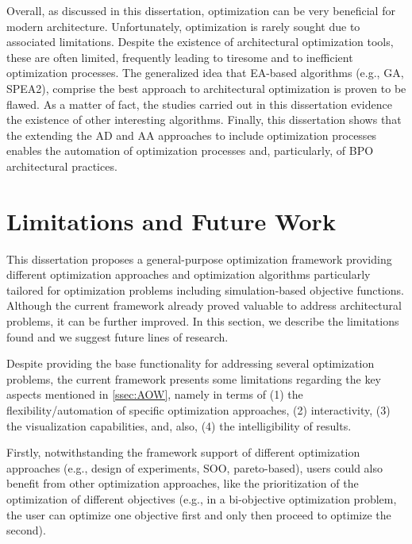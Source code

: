 Overall, as discussed in this dissertation, optimization can be very beneficial for modern architecture. Unfortunately, optimization is rarely sought due to associated limitations. Despite the existence of architectural optimization tools, these are often limited, frequently leading to tiresome and to inefficient optimization processes. The generalized idea that \ac{EA}-based algorithms (e.g., \ac{GA}, \ac{SPEA2}), comprise the best approach to architectural optimization is proven to be flawed. As a matter of fact, the studies carried out in this dissertation evidence the existence of other interesting algorithms. Finally, this dissertation shows that the extending the \ac{AD} and \ac{AA} approaches to include optimization processes enables the automation of optimization processes and, particularly, of \ac{BPO} architectural practices. 
	
\section{Limitations and Future Work}

This dissertation proposes a general-purpose optimization framework providing different optimization approaches and optimization algorithms particularly tailored for optimization problems including simulation-based objective functions. Although the current framework already proved valuable to address architectural problems, it can be further improved. In this section, we describe the limitations found and we suggest future lines of research.

Despite providing the base functionality for addressing several optimization problems, the current framework presents some limitations regarding the key aspects mentioned in \cref{ssec:AOW}, namely in terms of (1) the flexibility/automation of specific optimization approaches, (2) interactivity, (3) the visualization capabilities, and, also, (4) the intelligibility of results.

Firstly, notwithstanding the framework support of different optimization approaches (e.g., design of experiments, \ac{SOO}, pareto-based), users could also benefit from other optimization approaches, like the prioritization of the optimization of different objectives (e.g., in a bi-objective optimization problem, the user can optimize one objective first and only then proceed to optimize the second). 

